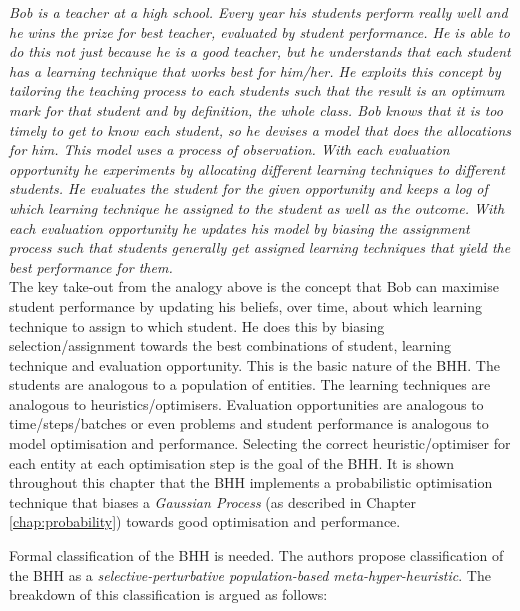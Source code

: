 \textit{
    Bob is a teacher at a high school. Every year his students perform really well and he wins the prize for best teacher, evaluated by student performance. He is able to do this not just because he is a good teacher, but he understands that each student has a learning technique that works best for him/her. He exploits this concept by tailoring the teaching process to each students such that the result is an optimum mark for that student and by definition, the whole class. Bob knows that it is too timely to get to know each student, so he devises a model that does the allocations for him. This model uses a process of observation. With each evaluation opportunity he experiments by allocating different learning techniques to different students. He evaluates the student for the given opportunity and keeps a log of which learning technique he assigned to the student as well as the outcome. With each evaluation opportunity he updates his model by biasing the assignment process such that students generally get assigned learning techniques that yield the best performance for them.
}\\

The key take-out from the analogy above is the concept that Bob can maximise student performance by updating his beliefs, over time, about which learning technique to assign to which student. He does this by biasing selection/assignment towards the best combinations of student, learning technique
and evaluation opportunity. This is the basic nature of the \Ac{BHH}. The students are analogous to a population of entities. The learning techniques are analogous to heuristics/optimisers. Evaluation opportunities are analogous to time/steps/batches or even problems  and student performance is analogous to model optimisation and performance. Selecting the correct heuristic/optimiser for each entity at each optimisation step is the goal of the \Ac{BHH}. It is shown throughout this chapter that the \Ac{BHH} implements a probabilistic optimisation technique that biases a \textit{Gaussian Process} (as described in Chapter \ref{chap:probability}) towards good optimisation and performance.

Formal classification of the \Ac{BHH} is needed. The authors propose classification of the \Ac{BHH} as a \textit{selective-perturbative population-based meta-hyper-heuristic}. The breakdown of this classification is argued as follows:

